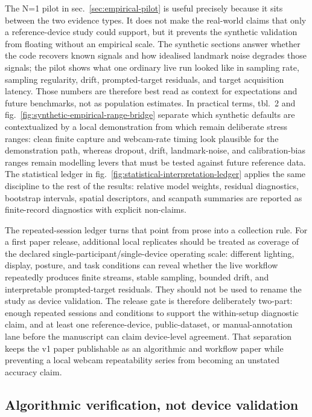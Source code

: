 \documentclass[
]{article}
\begin{document}
The N=1 pilot in sec.~\ref{sec:empirical-pilot} is useful precisely
because it sits between the two evidence types. It does not make the
real-world claims that only a reference-device study could support, but
it prevents the synthetic validation from floating without an empirical
scale. The synthetic sections answer whether the code recovers known
signals and how idealised landmark noise degrades those signals; the
pilot shows what one ordinary live run looked like in sampling rate,
sampling regularity, drift, prompted-target residuals, and target
acquisition latency. Those numbers are therefore best read as context
for expectations and future benchmarks, not as population estimates. In
practical terms, tbl.~2 and
fig.~\ref{fig:synthetic-empirical-range-bridge} separate which synthetic
defaults are contextualized by a local demonstration from which remain
deliberate stress ranges: clean finite capture and webcam-rate timing
look plausible for the demonstration path, whereas dropout, drift,
landmark-noise, and calibration-bias ranges remain modelling levers that
must be tested against future reference data. The statistical ledger in
fig.~\ref{fig:statistical-interpretation-ledger} applies the same
discipline to the rest of the results: relative model weights, residual
diagnostics, bootstrap intervals, spatial descriptors, and scanpath
summaries are reported as finite-record diagnostics with explicit
non-claims.

The repeated-session ledger turns that point from prose into a
collection rule. For a first paper release, additional local replicates
should be treated as coverage of the declared
single-participant/single-device operating scale: different lighting,
display, posture, and task conditions can reveal whether the live
workflow repeatedly produces finite streams, stable sampling, bounded
drift, and interpretable prompted-target residuals. They should not be
used to rename the study as device validation. The release gate is
therefore deliberately two-part: enough repeated sessions and conditions
to support the within-setup diagnostic claim, and at least one
reference-device, public-dataset, or manual-annotation lane before the
manuscript can claim device-level agreement. That separation keeps the
v1 paper publishable as an algorithmic and workflow paper while
preventing a local webcam repeatability series from becoming an unstated
accuracy claim.

\subsection{Algorithmic verification, not device
validation}\label{algorithmic-verification-not-device-validation}
\end{document}
